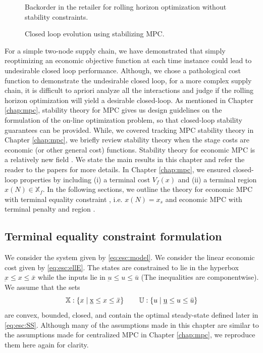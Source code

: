 \begin{figure}
\centering
\scriptsize
\resizebox{\textwidth}{!}{}
\caption{Backorder in the retailer for rolling horizon optimization
  without stability constraints.}
\label{fig:esc:unstable_SC}

\centering
\scriptsize
\resizebox{\textwidth}{!}{}
\caption{Closed loop evolution using stabilizing MPC.}
\label{fig:esc:stable_SC}

\end{figure}
For a simple two-node supply chain, we have demonstrated that simply
reoptimizing an economic objective function at each time instance
could lead to undesirable closed loop performance. Although, we chose
a pathological cost function to demonstrate the undesirable closed
loop, for a more complex supply chain, it is difficult to apriori
analyze all the interactions and judge if the rolling horizon
optimization will yield a desirable closed-loop. As mentioned in
Chapter \ref{chap:mpc}, stability theory for MPC gives us design
guidelines on the formulation of the on-line optimization problem, so that
closed-loop stability guarantees can be provided. While, we covered
tracking MPC stability theory in Chapter \ref{chap:mpc}, we briefly
review stability theory when the stage costs are economic (or other
general cost) functions. Stability theory for economic MPC is a
relatively new field \citep{diehl:amrit:rawlings:2011}
\citep{amrit:rawlings:angeli:2011}. We state the main results in this
chapter and refer the reader to the papers for more details. In
Chapter \ref{chap:mpc}, we ensured closed-loop properties by including
(i) a terminal cost $V_f(x)$ and (ii) a terminal region $x(N) \in
\mathbb{X}_f$. In the following sections, we outline the theory for economic MPC with terminal
equality constraint \citep{diehl:amrit:rawlings:2011}, i.e. $x(N) =
x_s$  and economic MPC with terminal penalty and region
\citep{amrit:rawlings:angeli:2011}.
 
\subsection{Terminal equality constraint formulation}
\label{sec:esc:terminal_equality}

We consider the system given by \eqref{eq:esc:model}. We consider the linear economic
cost given by \eqref{eq:esc:ellE}. The states are constrained to lie in
the hyperbox $\underbar{x} \leq x \leq \bar{x}$ while the inputs lie in
$\underbar{u} \leq u \leq \bar{u}$ (The inequalities are
componentwise). We assume that the sets 
\[\mathbb{X}: \left\lbrace x \mid \underbar{x} \leq x \leq  \bar{x} \right\rbrace \qquad \mathbb{U}: \left\lbrace u \mid \underbar{u} \leq u \leq \bar{u} \right\rbrace\] are
convex, bounded, closed, and contain the optimal steady-state defined later in
\eqref{eq:esc:SS}. Although many of the assumptions made in this chapter
are similar to the assumptions made for centralized MPC in Chapter
\ref{chap:mpc}, we reproduce them here again for clarity.

